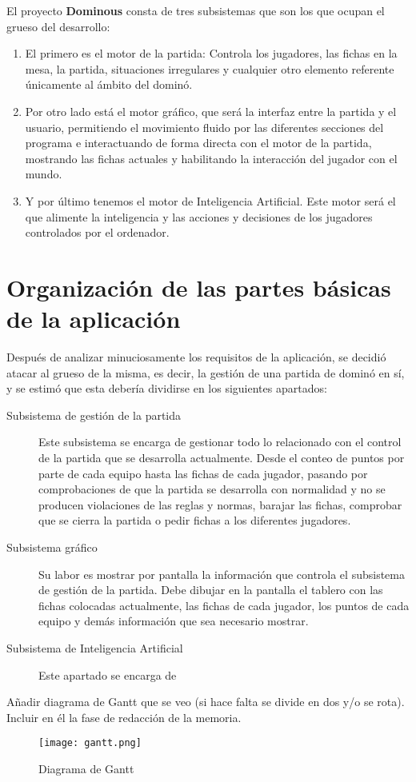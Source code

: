 El proyecto \textbf{Dominous} consta de tres subsistemas que son los que ocupan el grueso del desarrollo:
\begin{enumerate}
    \item El primero es el motor de la partida: Controla los jugadores, las fichas en la mesa, la partida, situaciones irregulares
            y cualquier otro elemento referente únicamente al ámbito del dominó.
    \item Por otro lado está el motor gráfico, que será la interfaz entre la partida y el usuario, permitiendo el movimiento
            fluido por las diferentes secciones del programa e interactuando de forma directa con el motor de la partida,
            mostrando las fichas actuales y habilitando la interacción del jugador con el mundo.
    \item Y por último tenemos el motor de Inteligencia Artificial. Este motor será el que alimente la inteligencia
            y las acciones y decisiones de los jugadores controlados por el ordenador.
\end{enumerate}

\section{Organización de las partes básicas de la aplicación}

Después de analizar minuciosamente los requisitos de la aplicación, se decidió atacar al grueso de la misma,
es decir, la gestión de una partida de dominó en sí, y se estimó que esta debería dividirse en los siguientes
apartados:
\begin{description}
    \item[Subsistema de gestión de la partida] Este subsistema se encarga de gestionar todo lo relacionado
            con el control de la partida que se desarrolla actualmente. Desde el conteo de puntos por parte
            de cada equipo hasta las fichas de cada jugador, pasando por comprobaciones de que la partida
            se desarrolla con normalidad y no se producen violaciones de las reglas y normas, barajar las
            fichas, comprobar que se cierra la partida o pedir fichas a los diferentes jugadores.
    \item[Subsistema gráfico] Su labor es mostrar por pantalla la información que controla el subsistema
            de gestión de la partida. Debe dibujar en la pantalla el tablero con las fichas colocadas
            actualmente, las fichas de cada jugador, los puntos de cada equipo y demás información que
            sea necesario mostrar.
    \item[Subsistema de Inteligencia Artificial] Este apartado se encarga de 
\end{description}

Añadir diagrama de Gantt que se veo (si hace falta se divide en dos y/o se rota). Incluir en él la fase de redacción de la memoria.

\begin{figure}[h]
  \label{gantt}
  \begin{center}
    \texttt{[image: gantt.png]}
  \end{center}
  \caption{Diagrama de Gantt}
\end{figure}

